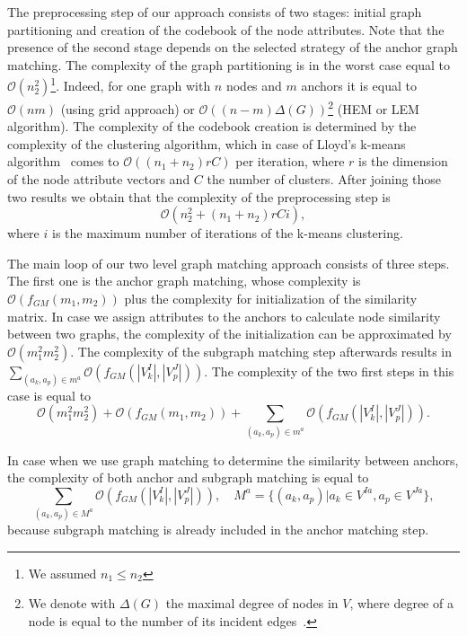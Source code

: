 The preprocessing step of our approach consists of two stages: initial graph partitioning and creation of the codebook of the node attributes. Note that the presence of the second stage depends on the selected strategy of the anchor graph matching. The complexity of the graph partitioning is in the worst case equal to $\mathcal{O}(n_2^2)$\footnote{We assumed $n_1\le n_2$}. Indeed, for one graph with $n$ nodes and $m$ anchors it is equal to $\mathcal{O}(nm)$ (using grid approach) or $\mathcal{O}((n-m)\Delta(G))$\footnote{We denote with $\Delta(G)$ the maximal degree of nodes in $V$, where degree of a node is equal to the number of its incident edges~\cite{Diestel2000}.} (HEM or LEM algorithm). The complexity of the codebook creation is determined by the complexity of the clustering algorithm, which in case of Lloyd's k-means algorithm~\cite{kmeans_LLoyd} comes to $\mathcal{O}((n_1+n_2)rC)$ per iteration, where $r$ is the dimension of the node attribute vectors and $C$ the number of clusters. After joining those two results we obtain that the complexity of the preprocessing step is
\begin{equation}\label{eq:complexity1}
\mathcal{O}(n_2^2+(n_1+n_2)rCi),
\end{equation}where $i$ is the maximum number of iterations of the k-means clustering.

The main loop of our two level graph matching approach consists of three steps. The first one is the anchor graph matching, whose complexity is $\mathcal{O}(f_{GM}(m_1,m_2))$ plus the complexity for initialization of the similarity matrix. In case we assign attributes to the anchors to calculate node similarity between two graphs, the complexity of the initialization can be approximated by $\mathcal{O}(m_1^2m_2^2)$. The complexity of the subgraph matching step afterwards results in $\sum_{(a_k,a_p)\in m^a}\mathcal{O}(f_{GM}(|V^I_k|,|V^J_p|))$. The complexity of the two first steps in this case is equal to
\begin{equation}\label{eq:complexity2}
\mathcal{O}(m_1^2m_2^2)+\mathcal{O}(f_{GM}(m_1,m_2))+\sum_{(a_k,a_p)\in m^a}\mathcal{O}(f_{GM}(|V^I_k|,|V^J_p|)).
\end{equation}

In case when we use graph matching to determine the similarity between anchors, the complexity of both anchor and subgraph matching is equal to 
\begin{equation}
\sum_{(a_k,a_p)\in M^a}\mathcal{O}(f_{GM}(|V^I_k|,|V^J_p|)),\quad M^a=\{(a_k,a_p)|a_k\in V^{Ia},a_p\in V^{Ja}\},
\end{equation}because subgraph matching is already included in the anchor matching step.

